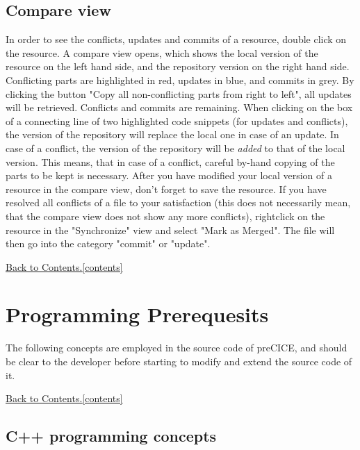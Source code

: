 \documentclass[11pt, oneside]{scrartcl}
\newcommand{\backtocontents}{\hyperref[contents]{Back to Contents.\ref*{contents}}}
\begin{document}
\subsection{Compare view}

In order to see the conflicts, updates and commits of a resource, double click
on the resource. A compare view opens, which shows the local version of the
resource on the left hand side, and the repository version on the right hand
side. Conflicting parts are highlighted in red, updates in blue, and commits in
grey. By clicking the button "Copy all non-conflicting parts from right to
left", all updates will be retrieved. Conflicts and commits are remaining. When
clicking on the box of a connecting line of two highlighted code snippets (for
updates and conflicts), the version of the repository will replace the local one
in case of an update. In case of a conflict, the version of the repository will
be \textit{added} to that of the local version. This means, that in case of a
conflict, careful by-hand copying of the parts to be kept is necessary. After
you have modified your local version of a resource in the compare view, don't
forget to save the resource. If you have resolved all conflicts of a file to
your satisfaction (this does not necessarily mean, that the compare view does
not show any more conflicts), rightclick on the resource in the "Synchronize"
view and select "Mark as Merged". The file will then go into the category
"commit" or "update".

\backtocontents
      

\section{Programming Prerequesits} \label{chap:prerequesits}
 
The following concepts are employed in the source code of preCICE, and should
be clear to the developer before starting to modify and extend the source code
of it.

\backtocontents
 
 
\subsection{C++ programming concepts}
    
\end{document}
